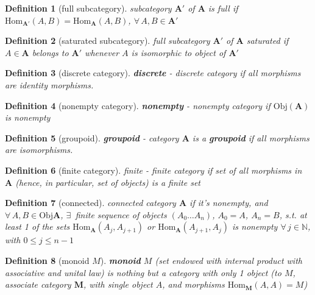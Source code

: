 \documentclass[10pt]{amsart}
\newtheorem{definition}{Definition}
\begin{document}
\begin{multicols*}{2}
\begin{definition}[full subcategory]
	subcategory $\mathbf{A}'$ of $\mathbf{A}$ is full if $\text{Hom}_{\mathbf{A}'}(A,B) = \text{Hom}_{\mathbf{A}}(A,B)$, $\forall \, A, B \in \mathbf{A}'$	
\end{definition}

\begin{definition}[saturated subcategory]
full subcategory $\mathbf{A}'$ of $\mathbf{A}$ saturated if $A \in \mathbf{A}$ belongs to $\mathbf{A}'$ whenever $A$ is isomorphic to object of $\mathbf{A}'$	
\end{definition}

\begin{definition}[discrete category]
	\textbf{discrete} - discrete category if all morphisms are identity morphisms.
\end{definition}

\begin{definition}[nonempty category]
	\textbf{nonempty} - nonempty category if $\text{Obj}(\mathbf{A})$ is nonempty
\end{definition}

\begin{definition}[groupoid]
\textbf{groupoid} - category $\mathbf{A}$ is a \textbf{groupoid} if all morphisms are isomorphisms.
\end{definition}

\begin{definition}[finite category]
	finite - finite category if set of all morphisms in $\mathbf{A}$ (hence, in particular, set of objects) is a finite set
\end{definition}

\begin{definition}[connected]
	connected category $\mathbf{A}$ if it's nonempty, and $\forall \, A,B \in \text{Obj}\mathbf{A}$, $\exists \, $ finite sequence of objects $(A_0 \dots A_n)$, $A_0 = A$, $A_n = B$, s.t. at least 1 of the sets $\text{Hom}_{\mathbf{A}}(A_j, A_{j+1})$ or $\text{Hom}_{\mathbf{A}}(A_{j+1}, A_j)$ is nonempty $\forall \, j \in \mathbb{N}$, with $0\leq j \leq n-1$
\end{definition}

\begin{definition}[monoid $M$]
	\textbf{monoid} $M$ (set endowed with internal product with associative and unital law) is nothing but a category with only 1 object (to $M$, associate category $\mathbf{M}$, with single object $A$, and morphisms $\text{Hom}_{\mathbf{M}}(A,A) = M$)
\end{definition}


\end{multicols*}
\end{document}
